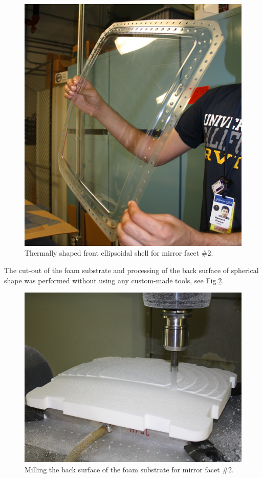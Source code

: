 \begin{figure}[ht]
    \centering
    \includegraphics[width=0.90\linewidth]{images/Front_Shell.png}
    \caption{Thermally shaped front ellipsoidal shell for mirror facet \#2.}
    \label{fig:Shell}
\end{figure}

The cut-out of the foam substrate and processing of the back surface of spherical shape was performed without using any custom-made tools, see Fig.\ref{fig:Cut_Substr}.
\begin{figure}[ht]
    \centering
    \includegraphics[width=0.9\linewidth]{images/Cut_Substr.png}
    \caption{Milling the back surface of the foam substrate for mirror facet \#2.}
    \label{fig:Cut_Substr}
\end{figure}

